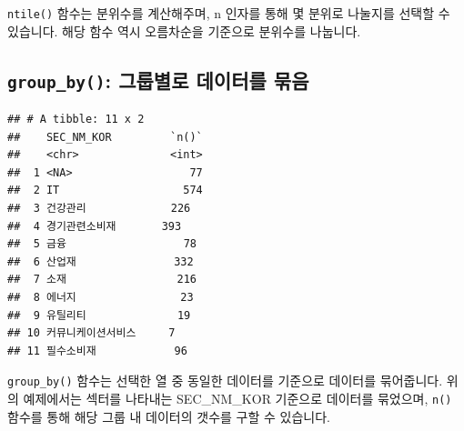 \documentclass[12pt,]{book}
\newenvironment{Shaded}{\begin{snugshade}}{\end{snugshade}}
\newcommand{\DataTypeTok}[1]{\textcolor[rgb]{0.13,0.29,0.53}{#1}}
\newcommand{\KeywordTok}[1]{\textcolor[rgb]{0.13,0.29,0.53}{\textbf{#1}}}
\newcommand{\NormalTok}[1]{#1}
\newcommand{\OperatorTok}[1]{\textcolor[rgb]{0.81,0.36,0.00}{\textbf{#1}}}
\newcommand{\OtherTok}[1]{\textcolor[rgb]{0.56,0.35,0.01}{#1}}
\newcommand{\StringTok}[1]{\textcolor[rgb]{0.31,0.60,0.02}{#1}}
\begin{document}
\texttt{ntile()} 함수는 분위수를 계산해주며, n 인자를 통해 몇 분위로 나눌지를 선택할 수 있습니다. 해당 함수 역시 오름차순을 기준으로 분위수를 나눕니다.

\hypertarget{group_by---}{%
\subsection{\texorpdfstring{\texttt{group\_by()}: 그룹별로 데이터를 묶음}{group\_by(): 그룹별로 데이터를 묶음}}\label{group_by---}}

\begin{Shaded}
\end{Shaded}

\begin{verbatim}
## # A tibble: 11 x 2
##    SEC_NM_KOR         `n()`
##    <chr>              <int>
##  1 <NA>                  77
##  2 IT                   574
##  3 건강관리             226
##  4 경기관련소비재       393
##  5 금융                  78
##  6 산업재               332
##  7 소재                 216
##  8 에너지                23
##  9 유틸리티              19
## 10 커뮤니케이션서비스     7
## 11 필수소비재            96
\end{verbatim}

\texttt{group\_by()} 함수는 선택한 열 중 동일한 데이터를 기준으로 데이터를 묶어줍니다. 위의 예제에서는 섹터를 나타내는 SEC\_NM\_KOR 기준으로 데이터를 묶었으며, \texttt{n()} 함수를 통해 해당 그룹 내 데이터의 갯수를 구할 수 있습니다.

\begin{Shaded}
\end{Shaded}
\end{document}
